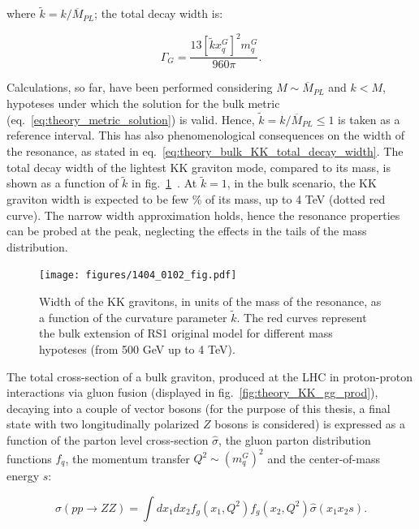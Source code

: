 \noindent where $\tilde{k} = k/\overline{M}_{PL}$; the total decay width is:

\begin{equation}
\Gamma_G = \frac{13 \left[ \tilde{k} x_q^G \right]^2 m_q^G}{960 \pi}.
\label{eq:theory_bulk_KK_total_decay_width}
\end{equation}

\noindent Calculations, so far, have been performed considering $M \sim \overline{M}_{PL}$ and $k < M$, hypoteses under which the solution for the bulk metric (eq.~\ref{eq:theory_metric_solution}) is valid. Hence, $\tilde{k} = k / \overline{M}_{PL} \leq 1$ is taken as a reference interval. This has also phenomenological consequences on the width of the resonance, as stated in eq.~\ref{eq:theory_bulk_KK_total_decay_width}. The total decay width of the lightest KK graviton mode, compared to its mass, is shown as a function of $\tilde{k}$ in fig.~\ref{fig:theory_grav_width_vs_ktilda}~\cite{Oliveira:2014kla}. At $\tilde{k} = 1$, in the bulk scenario, the KK graviton width is expected to be few \% of its mass, up to 4 TeV (dotted red curve). The narrow width approximation holds, hence the resonance properties can be probed at the peak, neglecting the effects in the tails of the mass distribution.

\begin{figure}[!htb]
  \centering
    \texttt{[image: figures/1404\_0102\_fig.pdf]}
  \caption{Width of the KK gravitons, in units of the mass of the resonance, as a function of the curvature parameter $\tilde{k}$. The red curves represent the bulk extension of RS1 original model for different mass hypoteses (from 500 GeV up to 4 TeV).}
  \label{fig:theory_grav_width_vs_ktilda}
\end{figure}

\noindent The total cross-section of a bulk graviton, produced at the LHC in proton-proton interactions via gluon fusion (displayed in fig.~\ref{fig:theory_KK_gg_prod}), decaying into a couple of vector bosons (for the purpose of this thesis, a final state with two longitudinally polarized $Z$ bosons is considered) is expressed as a function of the parton level cross-section $\hat{\sigma}$, the gluon parton distribution functions $f_q$, the momentum transfer $Q^2 \sim (m_q^G)^2$ and the center-of-mass energy $s$:

\begin{equation}
\sigma(pp \rightarrow ZZ) = \int dx_1 dx_2 f_g(x_1,Q^2) f_g(x_2, Q^2) \hat{\sigma}(x_1 x_2 s).
\label{eq:theory_cross_section_bulk}
\end{equation}

